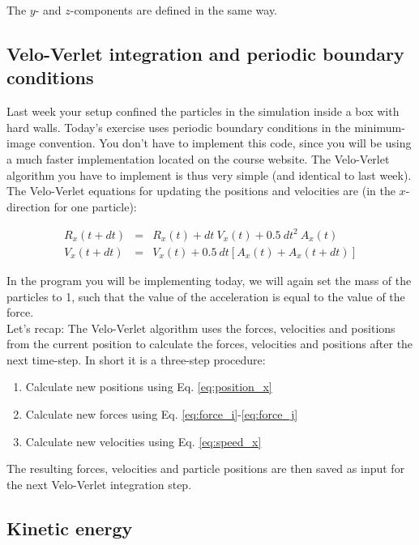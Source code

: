 \documentclass{article}
\begin{document}
The $y$- and $z$-components are defined in the same way.

\subsection{Velo-Verlet integration and periodic boundary conditions}

Last week your setup confined the particles in the simulation inside a box with hard walls.
Today's exercise uses periodic boundary conditions in the minimum-image convention.
%
You don't have to implement this code, since you will be using a much faster implementation located on the course website.
The Velo-Verlet algorithm you have to implement is thus very simple (and identical to last week).
The Velo-Verlet equations for updating the positions and velocities are (in the $x$-direction for one particle):

\begin{eqnarray}
    R_x(t + dt) &=& R_x(t) + dt\ V_x(t) + 0.5\ dt^2\ A_x(t) \label{eq:position_x}\\
    V_x(t + dt) &=& V_x(t) + 0.5\ dt \left[A_x(t) + A_x(t+dt)\right] \label{eq:speed_x}
\end{eqnarray}

In the program you will be implementing today, we will again set the mass of the particles to 1, such that the value of the acceleration is equal to the value of the force.\\

Let's recap: The Velo-Verlet algorithm uses the forces, velocities and positions from the current position to calculate the forces, velocities and positions after the next time-step.
In short it is a three-step procedure:

\begin{enumerate}
    \item Calculate new positions using Eq. \ref{eq:position_x}
    \item Calculate new forces using Eq. \ref{eq:force_i}-\ref{eq:force_j}
    \item Calculate new velocities using Eq. \ref{eq:speed_x}
\end{enumerate}

The resulting forces, velocities and particle positions are then saved as input for the next Velo-Verlet integration step.

\subsection{Kinetic energy}
\end{document}
